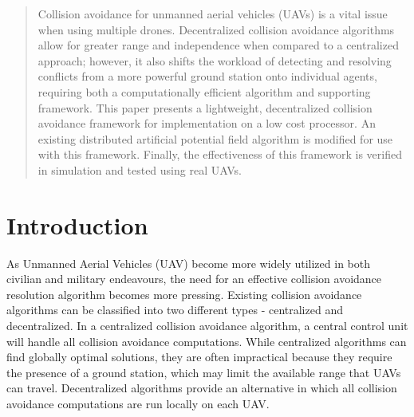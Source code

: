 \documentclass[conference]{IEEEtran}
\begin{document}
\maketitle


\begin{abstract}
Collision avoidance for unmanned aerial vehicles (UAVs) is a vital issue when using multiple drones. Decentralized collision avoidance algorithms allow for greater range and independence when compared to a centralized approach; however, it also shifts the workload of detecting and resolving conflicts from a more powerful ground station onto individual agents, requiring both a computationally efficient algorithm and supporting framework. This paper presents a lightweight, decentralized collision avoidance framework for implementation on a low cost processor. An existing distributed artificial potential field algorithm is modified for use with this framework. Finally, 
the effectiveness of this framework is verified in simulation and tested using real UAVs. 
\end{abstract}




%
\IEEEpeerreviewmaketitle



\section{Introduction}


As Unmanned Aerial Vehicles (UAV) become more widely utilized in both civilian and military endeavours, the need for an effective collision avoidance resolution algorithm becomes more pressing. 
Existing collision avoidance algorithms can be classified into two different types - centralized and decentralized.  
In a centralized collision avoidance algorithm, a central control unit will handle all collision avoidance computations. 
While centralized algorithms can find globally optimal solutions, they are often impractical because they require the presence of a ground station, which may limit the available range that UAVs can travel. Decentralized algorithms provide an alternative in which all collision avoidance computations are run locally on each UAV.
\end{document}
